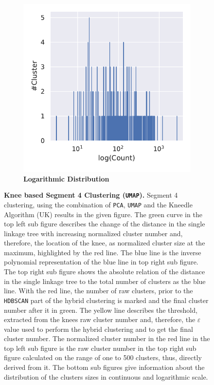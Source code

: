\begin{figure}[!hbt]
\begin{subfigure}[b]{0.475\textwidth}
    \end{subfigure}
    \hfill
    \begin{subfigure}[b]{0.475\textwidth}
        \caption[Logarithmic Distribution]{\textbf{Logarithmic Distribution}}
        \label{subfig:UMAP_Cluster_Knee_Distribution_log_4}            \includegraphics[width=\textwidth]{UMAP/Cluster_Distribution_Log_Segment_4.pdf}
    \end{subfigure}
    \caption[Knee based Segment 4 Clustering (\texttt{UMAP})]{\textbf{Knee based Segment 4 Clustering (\texttt{UMAP}).} Segment 4 clustering, using the combination of \texttt{PCA}, \texttt{UMAP} and the Kneedle Algorithm (UK) results in the given figure. The green curve in the top left sub figure describes the change of the distance in the single linkage tree with increasing normalized cluster number and, therefore, the location of the knee, as normalized cluster size at the maximum, highlighted by the red line. The blue line is the inverse polynomial representation of the blue line in top right sub figure. The top right sub figure shows the absolute relation of the distance in the single linkage tree to the total number of clusters as the blue line. With the red line, the number of raw clusters, prior to the \texttt{HDBSCAN} part of the hybrid clustering is marked and the final cluster number after it in green. The yellow line describes the threshold, extracted from the knees raw cluster number and, therefore, the $\varepsilon$ value used to perform the hybrid clustering and to get the final cluster number. The normalized cluster number in the red line in the top left sub figure is the raw cluster number in the top right sub figure calculated on the range of one to 500 clusters, thus, directly derived from it. The bottom sub figures give information about the distribution of the clusters sizes in continuous and logarithmic scale.}
    \label{fig:UMAP_Cluster_Knee_4}
\end{figure}

